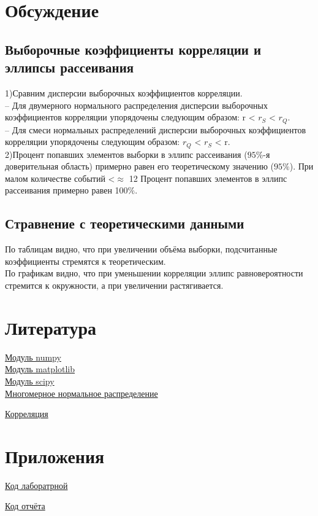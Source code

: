 \documentclass[a4]{article}
\begin{document}
	\section{Обсуждение}
		\subsection{Выборочные коэффициенты корреляции и эллипсы рассеивания}
			1)Сравним дисперсии выборочных коэффициентов корреляции.\\
			– Для двумерного нормального распределения дисперсии выборочных коэффициентов корреляции упорядочены следующим образом: r < $r_S$ < $r_Q$.\\
			– Для смеси нормальных распределений дисперсии выборочных
			коэффициентов корреляции упорядочены следующим образом:
			$r_Q$ < $r_S$ < r.\\
			
			2)Процент попавших элементов выборки в эллипс рассеивания ($95\%$-я доверительная область) примерно равен его теоретическому значению ($95\%$). При малом количестве событий <$\approx$ 12  Процент попавших элементов в эллипс рассеивания примерно равен 100$\%$.
		\subsection{Стравнение с теоретическими данными}
		По таблицам видно, что при увеличении объёма выборки, подсчитанные коэффициенты стремятся к теоретическим.\\
		По графикам видно, что при уменьшении корреляции эллипс равновероятности стремится к окружности, а при увеличении растягивается.
	\section{Литература}
	
	\href{https://physics.susu.ru/vorontsov/language/numpy.html}{Модуль numpy}\\
	
	\href{https://matplotlib.org/}{Модуль matplotlib}\\
	
	\href{https://www.scipy.org/}{Модуль scipy}\\
	
	
	\href{https://ru.wikipedia.org/wiki/%D0%9C%D0%BD%D0%BE%D0%B3%D0%BE%D0%BC%D0%B5%D1%80%D0%BD%D0%BE%D0%B5_%D0%BD%D0%BE%D1%80%D0%BC%D0%B0%D0%BB%D1%8C%D0%BD%D0%BE%D0%B5_%D1%80%D0%B0%D1%81%D0%BF%D1%80%D0%B5%D0%B4%D0%B5%D0%BB%D0%B5%D0%BD%D0%B8%D0%B5}{Многомерное нормальное распределение}
	
	\href{https://ru.wikipedia.org/wiki/%D0%9A%D0%BE%D1%80%D1%80%D0%B5%D0%BB%D1%8F%D1%86%D0%B8%D1%8F}{Корреляция}
	
	
	\section{Приложения}
	
	\href{https://github.com/LuciusGen/Matstat/blob/master/Lab5/Lab5.py}{Код лаборатрной}
	
	\href{https://github.com/LuciusGen/Matstat/blob/master/Lab5/lab5.tex}{Код отчёта}
	
\end{document}
